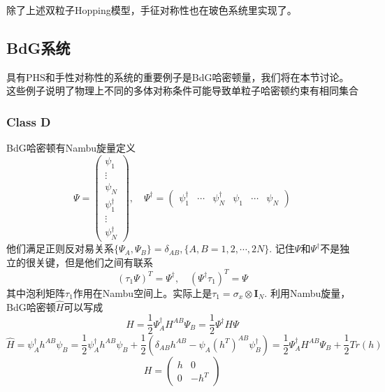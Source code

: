 \documentclass{article}
\numberwithin{equation}{subsection}
\begin{document}
除了上述双粒子Hopping模型，手征对称性也在玻色系统里实现了。

\subsection{BdG系统}
具有PHS和手性对称性的系统的重要例子是BdG哈密顿量，我们将在本节讨论。这些例子说明了物理上不同的多体对称条件可能导致单粒子哈密顿约束有相同集合
\subsubsection{Class D}
BdG哈密顿有Nambu旋量定义
\begin{equation}
    \Psi=\begin{pmatrix}
        \psi_1\\
        \vdots\\
        \psi_N\\
        \psi_1^\dagger\\
        \vdots\\
        \psi_N^\dagger
    \end{pmatrix},\quad
        \Psi^\dagger=\begin{pmatrix}
            \psi_1^\dagger&\cdots&\psi_N^\dagger&\psi_1&\cdots&\psi_N
        \end{pmatrix}
\end{equation}
他们满足正则反对易关系$\{\Psi_A,\Psi_B\}=\delta_{AB},\{A,B=1,2,\cdots,2N\}$. 记住$\Psi$和$\Psi^\dagger$不是独立的很关键，但是他们之间有联系
\begin{equation}\label{BdG relation}
    (\tau_1\Psi)^T=\Psi^\dagger,\quad (\Psi^\dagger\tau_1)^T=\Psi
\end{equation}
其中泡利矩阵$\tau_1$作用在Nambu空间上。实际上是$\tau_1=\sigma_x\otimes \mathbf{I}_N$. 利用Nambu旋量，BdG哈密顿$\hat{H}$可以写成
\begin{equation}
    \hat{H}=\frac{1}{2}\Psi_A^\dagger H^{AB}\Psi_B=\frac{1}{2}\Psi^\dagger H\Psi
\end{equation}
\begin{equation}
    \hat{H}=\psi_A^\dagger h^{AB}\psi_B=\frac{1}{2}\psi_A^\dagger h^{AB}\psi_B+\frac{1}{2}(\delta_{AB}h^{AB}-\psi_A (h^T)^{AB}\psi_B^\dagger)=\frac{1}{2}\Psi_A^\dagger H^{AB}\Psi_{B}+\frac{1}{2}Tr(h)
\end{equation}
\begin{equation}
    H=\begin{pmatrix}
        h&0\\
        0&-h^T
    \end{pmatrix}
\end{equation}
\end{document}
